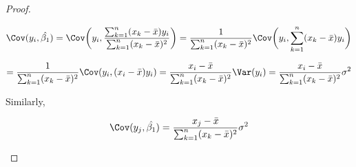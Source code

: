 \begin{proof}
\begin{enumerate}[(a)]
\[
\Cov(y_i, \hat{\beta_1}) = \Cov \bigg(y_i, \frac{\sum_{k=1}^n (x_k - \bar{x})y_i}{\sum_{k=1}^n (x_k - \bar{x})^2} \bigg) = \frac{1}{\sum_{k=1}^n (x_k - \bar{x})^2} \Cov \bigg(y_i, \sum_{k=1}^n (x_k - \bar{x})y_i \bigg)
\]

\[
= \frac{1}{\sum_{k=1}^n (x_k - \bar{x})^2} \Cov (y_i,  (x_i - \bar{x})y_i ) = \frac{x_i - \bar{x}}{\sum_{k=1}^n (x_k - \bar{x})^2} \Var (y_i) = \frac{x_i - \bar{x}}{\sum_{k=1}^n (x_k - \bar{x})^2}  \sigma^2
\]

Similarly, 

\[
\Cov(y_j, \hat{\beta_1}) = \frac{x_j - \bar{x}}{\sum_{k=1}^n (x_k - \bar{x})^2}  \sigma^2
\]

%
%
%
%
%
%
%
%

\end{enumerate}
\end{proof}
